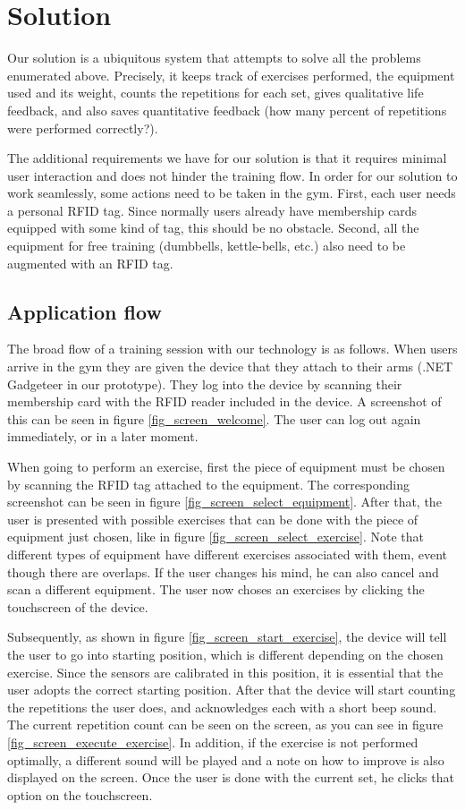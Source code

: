 \documentclass{tk3-team}
\begin{document}
\section{Solution}

Our solution is a ubiquitous system that attempts to solve all the problems enumerated above. Precisely, it keeps track of exercises performed, the equipment used and its weight, counts the repetitions for each set, gives qualitative life feedback, and also saves quantitative feedback (how many percent of repetitions were performed correctly?).

The additional requirements we have for our solution is that it requires minimal user interaction and does not hinder the training flow. In order for our solution to work seamlessly, some actions need to be taken in the gym. First, each user needs a personal RFID tag. Since normally users already have membership cards equipped with some kind of tag, this should be no obstacle. Second, all the equipment for free training (dumbbells, kettle-bells, etc.) also need to be augmented with an RFID tag.

\subsection{Application flow}
The broad flow of a training session with our technology is as follows. When users arrive in the gym they are given the device that they attach to their arms (.NET Gadgeteer in our prototype). They log into the device by scanning their membership card with the RFID reader included in the device. A screenshot of this can be seen in figure \ref{fig_screen_welcome}. The user can log out again immediately, or in a later moment.

When going to perform an exercise, first the piece of equipment must be chosen by scanning the RFID tag attached to the equipment. The corresponding screenshot can be seen in figure \ref{fig_screen_select_equipment}. After that, the user is presented with possible exercises that can be done with the piece of equipment just chosen, like in figure \ref{fig_screen_select_exercise}. Note that different types of equipment have different exercises associated with them, event though there are overlaps. If the user changes his mind, he can also cancel and scan a different equipment. The user now choses an exercises by clicking the touchscreen of the device.

Subsequently, as shown in figure \ref{fig_screen_start_exercise}, the device will tell the user to go into starting position, which is different depending on the chosen exercise. Since the sensors are calibrated in this position, it is essential that the user adopts the correct starting position. After that the device will start counting the repetitions the user does, and acknowledges each with a short beep sound. The current repetition count can be seen on the screen, as you can see in figure \ref{fig_screen_execute_exercise}. In addition, if the exercise is not performed optimally, a different sound will be played and a note on how to improve is also displayed on the screen. Once the user is done with the current set, he clicks that option on the touchscreen.
\end{document}
